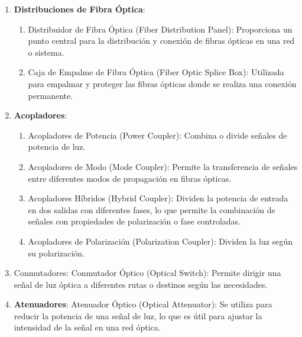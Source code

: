 \documentclass[
	12pt, %
	fleqn, %
	a4paper, %
	oneside, %
]{LegrandOrangeBook}
\begin{document}
\begin{enumerate}
\item \textbf{Distribuciones de Fibra Óptica}:
\begin{enumerate}
\item Distribuidor de Fibra Óptica (Fiber Distribution Panel): Proporciona un punto central para la distribución y conexión de fibras ópticas en una red o sistema.
\item Caja de Empalme de Fibra Óptica (Fiber Optic Splice Box): Utilizada para empalmar y proteger las fibras ópticas donde se realiza una conexión permanente.
\end{enumerate}
\item \textbf{Acopladores}:
\begin{enumerate}
\item Acopladores de Potencia (Power Coupler): Combina o divide señales de potencia de luz.
\item Acopladores de Modo (Mode Coupler): Permite la transferencia de señales entre diferentes modos de propagación en fibras ópticas.
\item Acopladores Híbridos (Hybrid Coupler): Dividen la potencia de entrada en dos salidas con diferentes fases, lo que permite la combinación de señales con propiedades de polarización o fase controladas.
\item Acopladores de Polarización (Polarization Coupler): Dividen la luz según su polarización.
\end{enumerate}
\item Conmutadores: Conmutador Óptico (Optical Switch): Permite dirigir una señal de luz óptica a diferentes rutas o destinos según las necesidades.
\item \textbf{Atenuadores}: Atenuador Óptico (Optical Attenuator): Se utiliza para reducir la potencia de una señal de luz, lo que es útil para ajustar la intensidad de la señal en una red óptica.
\end{enumerate}
\end{document}
